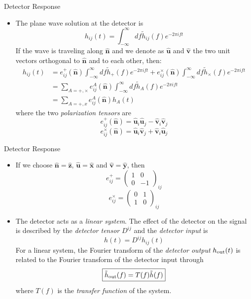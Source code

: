 \documentclass[size=11pt,style=paintings]{powerdot}
\begin{document}
  
  \begin{slide}{Detector Response}
 \begin{itemize}
 \item The plane wave solution at the detector is
 $$
h_{ij}(t)=\int_{-\infty}^{\infty} d f \tilde{h}_{ij}(f) e^{-2 \pi
i f t}
$$
\vskip -0.2cm
If the wave is traveling along $\hat{\mathbf{n}}$ and we denote as $\hat{\mathbf{u}}$ and $\hat{\mathbf{v}}$ the two unit vectors orthogonal to  $\hat{\mathbf{n}}$ and to each other, then:
$$
\begin{aligned} h_{i j}(t) &= e_{i j}^{+}(\hat{\mathbf{n}}) \int_{-\infty}^{\infty} d f \tilde{h}_{+}(f) e^{-2 \pi i f t} + e_{i j}^{\times}(\hat{\mathbf{n}})
\int_{-\infty}^{\infty} d f \tilde{h}_{\times}(f) e^{-2 \pi i f t} \\ 
&=\sum_{A=+, \times} e_{i j}^{A}(\hat{\mathbf{n}})
\int_{-\infty}^{\infty} d f \tilde{h}_{A}(f) e^{-2 \pi i f t} \\ 
&=\sum_{A=+, x} e_{i j}^{A}(\hat{\mathbf{n}}) h_{A}(t) \end{aligned}
$$
\vskip -0.2cm
where the two \textit{polarization tensors} are
\vskip -0.2cm
$$
e_{i j}^{+}(\hat{\mathbf{n}})=\hat{\mathbf{u}}_{i} \hat{\mathbf{u}}_{j}-\hat{\mathbf{v}}_{i} \hat{\mathbf{v}}_{j}
$$
$$
 e_{i j}^{\times}(\hat{\mathbf{n}})=\hat{\mathbf{u}}_{i}
\hat{\mathbf{v}}_{j}+\hat{\mathbf{v}}_{i} \hat{\mathbf{u}}_{j}
$$
 \end{itemize}
 \end{slide}
 
  
  \begin{slide}{Detector Response}
 \begin{itemize}
 \item If we choose $\hat{\mathbf{n}}=\hat{\mathbf{z}}$, $\hat{\mathbf{u}}=\hat{\mathbf{x}}$
and $\hat{\mathbf{v}}=\hat{\mathbf{y}}$, then
$$
e_{ij}^{+}=\left(\begin{array}{cc}{1} & {0} \\ {0} & {-1}\end{array}\right)_{ij}
$$
$$
e_{ij}^{\times}=\left(\begin{array}{ll}{0} & {1} \\ {1} & {0}\end{array}\right)_{ij}
$$

\item The detector acts as a \textit{linear system}. The effect of the detector on the signal is described by the \textit{detector tensor} $D^{ij}$ and the \textit{detector input} is 
$$
\boxed{h(t)=D^{i j} h_{i j}(t)}
$$
For a linear system, the Fourier transform of the \textit{detector output} ${h}_{\rm {out }}(t)$ is related to the Fourier transform of the detector input through
$$
\boxed{\tilde{h}_{\rm {out }}(f)=T(f) \tilde{h}(f)}
$$ 
where $T(f)$ is the \textit{transfer function} of the system.\end{itemize}
 \end{slide}
 
\end{document}
